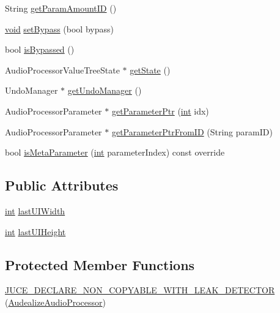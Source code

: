 \begin{DoxyCompactItemize}
String \hyperlink{class_audealize_1_1_audealize_audio_processor_a51c55287fa572a64f190073eba193b8f}{get\+Param\+Amount\+ID} ()
\item 
\hyperlink{tk_8h_aba408b7cd755a96426e004c015f5de8e}{void} \hyperlink{class_audealize_1_1_audealize_audio_processor_ade8920185102ceb1bbe69a19e7684d17}{set\+Bypass} (bool bypass)
\item 
bool \hyperlink{class_audealize_1_1_audealize_audio_processor_a169490241e1d2fee31441e18a3c32f58}{is\+Bypassed} ()
\item 
Audio\+Processor\+Value\+Tree\+State $\ast$ \hyperlink{class_audealize_1_1_audealize_audio_processor_a78578b6f542baf5a016ba1e93bf09f5c}{get\+State} ()
\item 
Undo\+Manager $\ast$ \hyperlink{class_audealize_1_1_audealize_audio_processor_ab6dc016d76b7fdf017324d99152825a3}{get\+Undo\+Manager} ()
\item 
Audio\+Processor\+Parameter $\ast$ \hyperlink{class_audealize_1_1_audealize_audio_processor_a436bbcaf366e9b32248f30304677a176}{get\+Parameter\+Ptr} (\hyperlink{tk_8h_a83f82f76e7fed06f4c49d2db94028a6d}{int} idx)
\item 
Audio\+Processor\+Parameter $\ast$ \hyperlink{class_audealize_1_1_audealize_audio_processor_afc5192d771658654d3be356cec36972a}{get\+Parameter\+Ptr\+From\+ID} (String param\+ID)
\item 
bool \hyperlink{class_audealize_1_1_audealize_audio_processor_a70ac8d869b16af3ca9a17486c1677134}{is\+Meta\+Parameter} (\hyperlink{tk_8h_a83f82f76e7fed06f4c49d2db94028a6d}{int} parameter\+Index) const  override
\end{DoxyCompactItemize}
\subsection*{Public Attributes}
\begin{DoxyCompactItemize}
\item 
\hyperlink{tk_8h_a83f82f76e7fed06f4c49d2db94028a6d}{int} \hyperlink{class_audealize_1_1_audealize_audio_processor_aa750e5a364f633d448d82fc2afc7c05a}{last\+U\+I\+Width}
\item 
\hyperlink{tk_8h_a83f82f76e7fed06f4c49d2db94028a6d}{int} \hyperlink{class_audealize_1_1_audealize_audio_processor_a05d825c7d24ae469cdebed82d92e9034}{last\+U\+I\+Height}
\end{DoxyCompactItemize}
\subsection*{Protected Member Functions}
\begin{DoxyCompactItemize}
\item 
\hyperlink{class_audealize_1_1_audealize_audio_processor_a175bb9f9d6be77b4bab3c38dd5351ed0}{J\+U\+C\+E\+\_\+\+D\+E\+C\+L\+A\+R\+E\+\_\+\+N\+O\+N\+\_\+\+C\+O\+P\+Y\+A\+B\+L\+E\+\_\+\+W\+I\+T\+H\+\_\+\+L\+E\+A\+K\+\_\+\+D\+E\+T\+E\+C\+T\+OR} (\hyperlink{class_audealize_1_1_audealize_audio_processor}{Audealize\+Audio\+Processor})
\end{DoxyCompactItemize}
